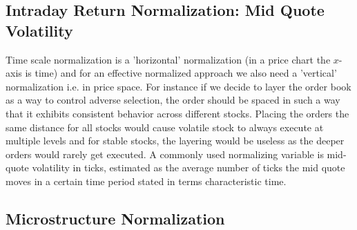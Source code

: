 
\subsection{Intraday Return Normalization: Mid Quote Volatility}

Time scale normalization is a 'horizontal' normalization (in a price chart the $x$-axis is time) and for an effective normalized approach we also need a 'vertical' normalization i.e. in price space. For instance if we decide to layer the order book as a way to control adverse selection, the order should be spaced in such a way that it exhibits consistent behavior across different stocks. Placing the orders the same distance for all stocks would cause volatile stock to always execute at multiple levels and for stable stocks, the layering would be useless as the deeper orders would rarely get executed. A commonly used normalizing variable is mid-quote volatility in ticks, estimated as the average number of ticks the mid quote moves in a certain time period stated in terms characteristic time. 




\subsection{Microstructure Normalization}

